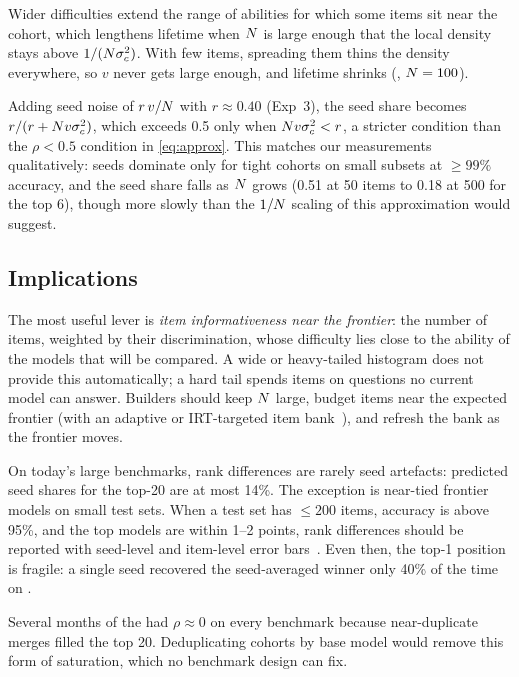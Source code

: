  Wider difficulties extend the range of abilities for which some items sit near the cohort, which lengthens lifetime when $N$ is large enough that the local density stays above $1/(N \sigma_{c}^2)$. With few items, spreading them thins the density everywhere, so $v$ never gets large enough, and lifetime shrinks (, $N = 100$).

 Adding seed noise of $r\,v/N$ with $r \approx 0.40$ (Exp~3), the seed share becomes $r/(r + N v \sigma_{c}^2)$, which exceeds 0.5 only when $N v \sigma_{c}^2 < r$, a stricter condition than the $\rho < 0.5$ condition in \eqref{eq:approx}. This matches our measurements qualitatively: seeds dominate only for tight cohorts on small subsets at $\ge 99\%$ accuracy, and the seed share falls as $N$ grows (0.51 at 50 items to 0.18 at 500 for the \arce top 6), though more slowly than the $1/N$ scaling of this approximation would suggest.

\subsection{Implications}

 The most useful lever is {\em item informativeness near the frontier}: the number of items, weighted by their discrimination, whose difficulty lies close to the ability of the models that will be compared. A wide or heavy-tailed histogram does not provide this automatically; a hard tail spends items on questions no current model can answer. Builders should keep $N$ large, budget items near the expected frontier (\eg with an adaptive or IRT-targeted item bank~\citep{zhuang2023efficiently,polo2024tinybenchmarks}), and refresh the bank as the frontier moves.

 On today's large benchmarks, rank differences are rarely seed artefacts: predicted seed shares for the \leaderboard top-20 are at most 14\%. The exception is near-tied frontier models on small test sets. When a test set has $\le 200$ items, accuracy is above 95\%, and the top models are within 1--2 points, rank differences should be reported with seed-level and item-level error bars~\citep{miller2024adding}. Even then, the top-1 position is fragile: a single seed recovered the seed-averaged winner only 40\% of the time on \arce.

 Several months of the \leaderboard had $\rho \approx 0$ on every benchmark because near-duplicate merges filled the top 20. Deduplicating cohorts by base model would remove this form of saturation, which no benchmark design can fix.

